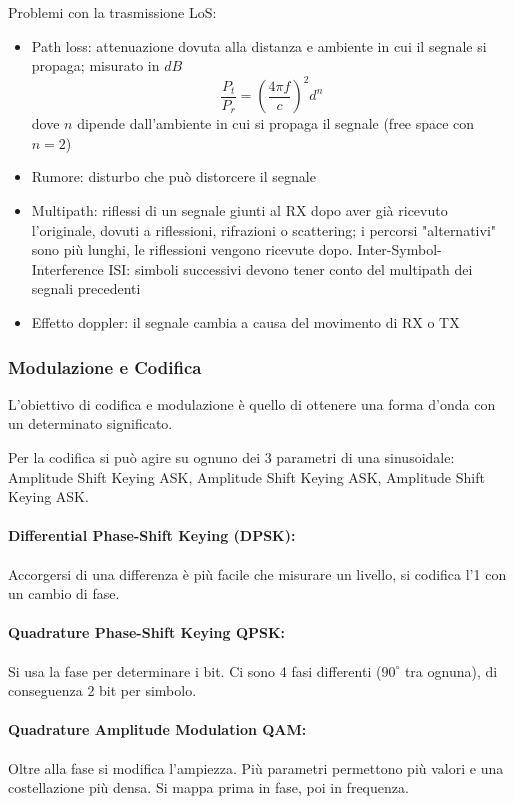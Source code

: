 Problemi con la trasmissione LoS: 
\begin{itemize}
    \item Path loss: attenuazione dovuta alla distanza e ambiente in cui il segnale si propaga; misurato in $dB$
    $$ \frac{P_t}{P_r} = \left(\frac{4 \pi f}{c}\right)^2 d^n$$
    dove $n$ dipende dall'ambiente in cui si propaga il segnale (free space con $n=2$)
    
    \item Rumore: disturbo che può distorcere il segnale
    
    \item Multipath: riflessi di un segnale giunti al RX dopo aver già ricevuto l'originale, dovuti a riflessioni, rifrazioni o scattering; i percorsi "alternativi" sono più lunghi, le riflessioni vengono ricevute dopo. Inter-Symbol-Interference ISI: simboli successivi devono tener conto del multipath dei segnali precedenti
    
    \item Effetto doppler: il segnale cambia a causa del movimento di RX o TX
\end{itemize}

\subsubsection{Modulazione e Codifica}

L'obiettivo di codifica e modulazione è quello di ottenere una forma d'onda con un determinato significato.

Per la codifica si può agire su ognuno dei 3 parametri di una sinusoidale: Amplitude Shift Keying ASK, Amplitude Shift Keying ASK, Amplitude Shift Keying ASK.

\paragraph{Differential Phase-Shift Keying (DPSK):} Accorgersi di una differenza è più facile che misurare un livello, si codifica l'1 con un cambio di fase.

\paragraph{Quadrature Phase-Shift Keying QPSK:} Si usa la fase per determinare i bit. Ci sono 4 fasi differenti ($90^\circ$ tra ognuna), di conseguenza 2 bit per simbolo.

\paragraph{Quadrature Amplitude Modulation QAM:} Oltre alla fase si modifica l'ampiezza. Più parametri permettono più valori e una costellazione più densa. Si mappa prima in fase, poi in frequenza.


